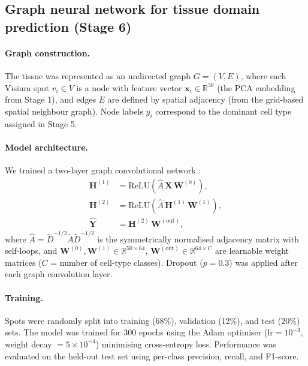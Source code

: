 \documentclass[12pt, a4paper]{article}
\begin{document}
\subsection{Graph neural network for tissue domain prediction (Stage 6)}

\paragraph{Graph construction.} The tissue was represented as an undirected graph $G = (V, E)$, where each Visium spot $v_i \in V$ is a node with feature vector $\mathbf{x}_i \in \mathbb{R}^{50}$ (the PCA embedding from Stage 1), and edges $E$ are defined by spatial adjacency (from the grid-based spatial neighbour graph). Node labels $y_i$ correspond to the dominant cell type assigned in Stage 5.

\paragraph{Model architecture.} We trained a two-layer graph convolutional network \citep{kipf2017}:
\begin{align}
\mathbf{H}^{(1)} &= \text{ReLU}\!\left(\hat{A}\,\mathbf{X}\,\mathbf{W}^{(0)}\right), \\
\mathbf{H}^{(2)} &= \text{ReLU}\!\left(\hat{A}\,\mathbf{H}^{(1)}\,\mathbf{W}^{(1)}\right), \\
\hat{\mathbf{Y}} &= \mathbf{H}^{(2)}\,\mathbf{W}^{(\text{out})},
\end{align}
where $\hat{A} = \tilde{D}^{-1/2}\tilde{A}\tilde{D}^{-1/2}$ is the symmetrically normalised adjacency matrix with self-loops, and $\mathbf{W}^{(0)}, \mathbf{W}^{(1)} \in \mathbb{R}^{50 \times 64}$, $\mathbf{W}^{(\text{out})} \in \mathbb{R}^{64 \times C}$ are learnable weight matrices ($C$ = number of cell-type classes). Dropout ($p = 0.3$) was applied after each graph convolution layer.

\paragraph{Training.} Spots were randomly split into training (68\%), validation (12\%), and test (20\%) sets. The model was trained for 300 epochs using the Adam optimiser ($\text{lr} = 10^{-3}$, weight decay $= 5 \times 10^{-4}$) minimising cross-entropy loss. Performance was evaluated on the held-out test set using per-class precision, recall, and F1-score.

\end{document}
